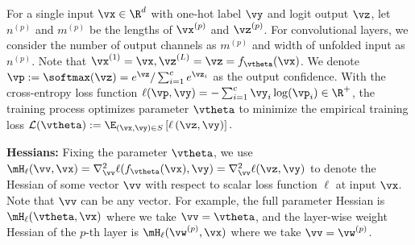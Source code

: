 For a single input $\vx\in\R^d$ with one-hot label $\vy$ and logit output $\vz$, let $n^{(p)}$ and $m^{(p)}$ be the lengths of $\vx^{(p)}$ and $\vz^{(p)}$.  For convolutional layers, we consider the number of output channels as $m^{(p)}$ and width of unfolded input as $n^{(p)}$. Note that $\vx^{(1)}=\vx,\vz^{(L)}=\vz = f_\vtheta(\vx)$. We denote $\vp := \softmax(\vz) = e^{\vz}/\sum_{i=1}^ce^{\vz_i}$ as the output confidence.
With the cross-entropy loss function $\ell(\vp, \vy) = -\sum_{i=1}^c\vy_i\log(\vp_i)\in\R^+$,
the training process optimizes parameter $\vtheta$ to minimize the empirical training loss $\mathcal{L}(\vtheta):=\mathop{\E}_{(\vx, \vy)\in S}\left[\ell\left(\vz, \vy\right)\right].$

\textbf{Hessians:} Fixing the parameter $\vtheta$, we use $\mH_{\ell}(\vv,\vx) = \nabla^2_\vv \ell(f_\vtheta(\vx), \vy) = \nabla^2_\vv \ell(\vz, \vy)$ to denote the Hessian of some vector $\vv$ with respect to scalar loss function $\ell$ at input $\vx$.  
Note that $\vv$ can be any vector. For example, the full parameter Hessian is $\mH_\ell(\vtheta, \vx)$ where we take $\vv = \vtheta$, and the layer-wise weight Hessian of the $p$-th layer is $\mH_\ell(\vw^{(p)}, \vx)$ where we take $\vv = \vw^{(p)}$.

